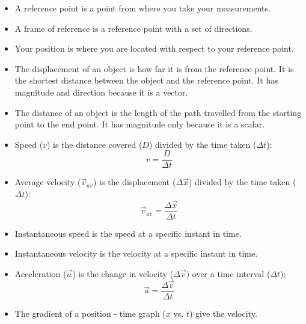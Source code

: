     \noindent
    \label{m38796*cid12}
            \nopagebreak
      \label{m38796*id80622}\begin{itemize}[noitemsep]
            \label{m38796*uid154}\item A reference point is a point from where you take your measurements.
\label{m38796*uid155}\item A frame of reference is a reference point with a set of directions.
\label{m38796*uid156}\item Your position is where you are located with respect to your reference point.
\label{m38796*uid157}\item The displacement of an object is how far it is from the reference point. It is the shortest distance between the object and the reference point. It has magnitude and direction because it is a vector.
\label{m38796*uid158}\item The distance of an object is the length of the path travelled from the starting point to the end point. It has magnitude only because it is a scalar.
\label{m38796*uid161}\item Speed ($v$) is the distance covered ($D$) divided by the time taken ($\Delta t$):
\label{m38796*id80758}\nopagebreak\noindent{}
    \begin{equation*}
    v=\frac{D}{\Delta t}
      \end{equation*}
    \label{m38796*uid162}\item Average velocity ($\vec{v}_{av}$) is the displacement ($\Delta \vec{x}$) divided by the time taken ($\Delta t$):
\label{m38796*id80827}\nopagebreak\noindent{}
    \begin{equation*}
    \vec{v}_{av}=\frac{\Delta \vec{x}}{\Delta t}
      \end{equation*}
    \label{m38796*uid163}\item Instantaneous speed is the speed at a specific instant in time.
\label{m38796*uid164}\item Instantaneous velocity is the velocity at a specific instant in time.
\label{m38796*uid165}\item Acceleration ($\vec{a}$) is the change in velocity ($\Delta \vec{v}$) over a time interval ($\Delta t$):
\label{m38796*id80925}\nopagebreak\noindent{}
    \begin{equation*}
    \vec{a}=\frac{\Delta \vec{v}}{\Delta t}
      \end{equation*}
    \label{m38796*uid166}\item The gradient of a position - time graph ($x$ vs. $t$) give the velocity.

\end{itemize}
